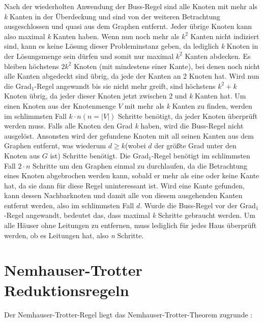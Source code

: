 Nach der wiederholten Anwendung der Buss-Regel sind alle Knoten mit mehr als \emph{k} Kanten in der Überdeckung und sind von der weiteren Betrachtung ausgeschlossen und quasi aus dem Graphen entfernt. Jeder übrige Knoten kann also maximal \emph{k} Kanten haben. Wenn nun noch mehr als $k^{2}$ Kanten nicht indiziert sind, kann es keine Lösung dieser Probleminstanz geben, da lediglich \emph{k} Knoten in der Lösungsmenge sein dürfen und somit nur maximal $k^{2}$ Kanten  abdecken. Es bleiben höchstens $2 k^{2}$ Knoten (mit mindestens einer Kante), bei denen noch nicht alle Kanten abgedeckt sind übrig\cite{param}, da jede der Kanten an 2 Knoten hat. Wird nun die Grad$_{1}$-Regel angewandt bis sie nicht mehr greift, sind höchstens $k^{2} + k$ Knoten übrig, da jeder dieser Knoten jetzt zwischen 2 und \emph{k} Kanten hat.
Um einen Knoten aus der Knotenmenge $V$ mit mehr als \emph{k} Kanten zu finden, werden im schlimmsten Fall $k \cdot n (n=|V|)$ Schritte benötigt, da jeder Knoten überprüft werden muss. Falls alle Knoten den Grad \emph{k} haben, wird die Buss-Regel nicht ausgelöst. Ansonsten wird der gefundene Knoten mit all seinen Kanten aus dem Graphen entfernt, was wiederum $d \geq k$(wobei $d$ der größte Grad unter den Knoten aus $G$ ist) Schritte benötigt. Die Grad$_{1}$-Regel benötigt im schlimmsten Fall $2 \cdot n$ Schritte um den Graphen einmal zu durchlaufen, da die Betrachtung eines Knoten abgebrochen werden kann, sobald er mehr als eine oder keine Kante hat, da sie dann für diese Regel uninteressant ist. Wird eine Kante gefunden, kann dessen Nachbarknoten und damit alle von diesem ausgehenden Kanten entfernt werden, also im schlimmsten Fall $d$. Wurde die Buss-Regel vor der Grad$_{1}$-Regel angewandt, bedeutet das, dass maximal \emph{k} Schritte gebraucht werden. Um alle Häuser ohne Leitungen zu entfernen, muss lediglich für jedes Haus überprüft werden, ob es Leitungen hat, also \emph{n} Schritte.

\section{Nemhauser-Trotter Reduktionsregeln}
\label{ch:Grundlagen:sec:Nemhauser-Trotter Reduktionsregeln}

Der Nemhauser-Trotter-Regel liegt das Nemhauser-Trotter-Theorem zugrunde \cite{trott}:


